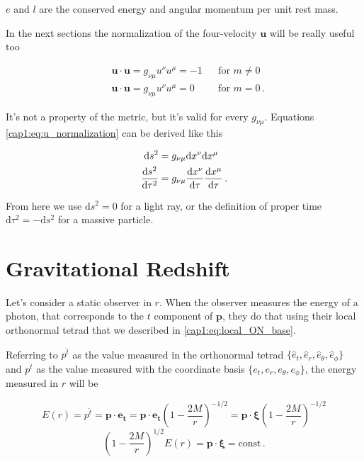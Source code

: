 $e$ and $l$ are the conserved energy and angular momentum per unit rest mass.

In the next sections the normalization of the four-velocity $\mathbf u$ will be
really useful too

\begin{subequations}
    \begin{align}
        &\mathbf{u \cdot u} = g_{\nu \mu} u^\nu u^\mu = -1 
        &&\text{for } m \neq 0 \label{cap1:eq:u_normalization_mass} \\
        &\mathbf{u \cdot u} = g_{\nu \mu} u^\nu u^\mu = 0 
        &&\text{for } m = 0 \label{cap1:eq:u_normalization_light} \, .
    \end{align}
    \label{cap1:eq:u_normalization}
\end{subequations}

It's not a property of the metric, but it's valid for every $g_{\nu \mu}$.
Equations \ref{cap1:eq:u_normalization} can be derived like this

\begin{align*}
    \mathrm{d}s^2 &= g_{\nu \mu} \mathrm{d}x^\nu \mathrm{d}x^\mu \\
    \dv{s^2}{\tau^2} &= g_{\nu \mu} \dv{x^\nu}{\tau} \dv{x^\mu}{\tau} \, .
\end{align*}

From here we use $\mathrm{d}s^2 = 0$ for a light ray, or the definition of
proper time $\mathrm{d}\tau^2 = - \mathrm{d}s^2$ for a massive particle.


\section{Gravitational Redshift}

Let's consider a static observer in $r$.
When the observer measures the energy of a photon, that corresponds to the $t$
component of $\mathbf{p}$, they do that using their local orthonormal tetrad
that we described in \ref{cap1:eq:local_ON_base}.

Referring to $p^{\hat t}$ as the value measured in the orthonormal tetrad
$\{\hat e_t, \hat e_r, \hat e_\theta, \hat e_\phi \}$ and
$p^t$ as the value measured with the coordinate basis
$\{e_{t}, e_{r}, e_{\theta}, e_{\phi} \}$, the energy measured in $r$ will be

\begin{equation*}
    E(r) = p^{\hat t} = \mathbf{p \cdot \hat e_t}
    = \mathbf{p \cdot e_t} \left(1 - \frac{2M}{r} \right)^{-1/2}
    = \mathbf{p \cdot \xi} \left(1 - \frac{2M}{r} \right)^{-1/2}
\end{equation*}
\begin{equation}
    \left(1 - \frac{2M}{r} \right)^{1/2} E(r) = \mathbf{p \cdot \xi}
    = \text{const} \, .
    \label{cap1:eq:photon_energy1}
\end{equation}

